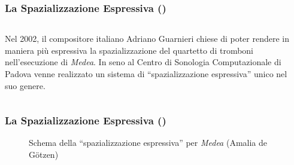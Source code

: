 \setcounter{ms}{0}
\begin{frame}
    \frametitle<+- | alert@+->{La Spazializzazione Espressiva ()}

    \begin{columns}[T]
        \begin{column}{0.7\textwidth}
            Nel 2002, il compositore italiano Adriano Guarnieri chiese di
            poter rendere in maniera pi\`u espressiva la spazializzazione del
            quartetto di tromboni nell'esecuzione di \emph{Medea}.
            In seno al Centro di Sonologia Computazionale di Padova venne
            realizzato un sistema di ``spazializzazione espressiva'' unico nel
            suo genere.
        \end{column}
        \begin{column}{0.3\textwidth}
        \end{column}
    \end{columns}
    
\end{frame}

\begin{frame}
    \frametitle{La Spazializzazione Espressiva ()}

    \begin{center}
        \begin{figure}
            \begin{center}
            \end{center}
            \caption{Schema della ``spazializzazione espressiva'' per \emph{Medea} (Amalia de G\"otzen)}
            \label{fig:medea processing}
        \end{figure}
    \end{center}
    
\end{frame}
